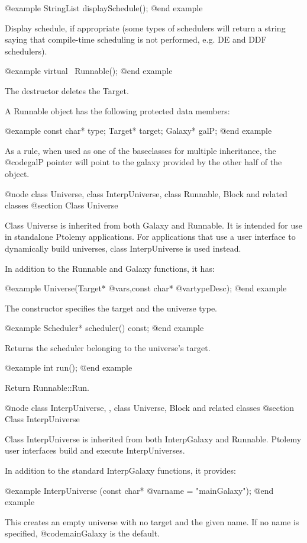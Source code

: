 @example
StringList displaySchedule();
@end example

Display schedule, if appropriate (some types of schedulers will return a
string saying that compile-time scheduling is not performed, e.g. DE
and DDF schedulers).

@example
virtual ~Runnable();
@end example

The destructor deletes the Target.

A Runnable object has the following protected data members:

@example
const char* type;
Target* target;
Galaxy* galP;
@end example

As a rule, when used as one of the baseclasses for multiple inheritance,
the @code{galP} pointer will point to the galaxy provided by the other
half of the object.

@node class Universe, class InterpUniverse, class Runnable, Block and related classes
@section Class Universe

Class Universe is inherited from both Galaxy and Runnable.  It is
intended for use in standalone Ptolemy applications.  For applications
that use a user interface to dynamically build universes, class
InterpUniverse is used instead.

In addition to the Runnable and Galaxy functions, it has:

@example
Universe(Target* @var{s},const char* @var{typeDesc});
@end example

The constructor specifies the target and the universe type.

@example
Scheduler* scheduler() const;
@end example

Returns the scheduler belonging to the universe's target.

@example
int run();
@end example

Return Runnable::Run.

@node class InterpUniverse,  , class Universe, Block and related classes
@section Class InterpUniverse

Class InterpUniverse is inherited from both InterpGalaxy and Runnable.
Ptolemy user interfaces build and execute InterpUniverses.

In addition to the standard InterpGalaxy functions, it provides:

@example
InterpUniverse (const char* @var{name} = "mainGalaxy");
@end example

This creates an empty universe with no target and the given name.
If no name is specified, @code{mainGalaxy} is the default.

